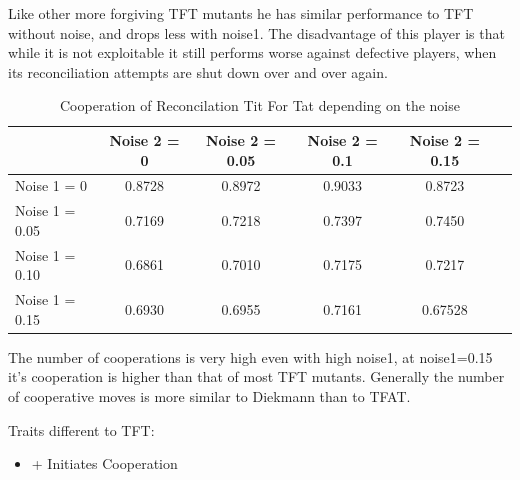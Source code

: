\documentclass[11pt,twoside]{article}
\begin{document}
Like other more forgiving TFT mutants he has similar performance to TFT without noise, and drops less with noise1. The disadvantage of this player is that while it is not exploitable it still performs worse against defective players, when its reconciliation attempts are shut down over and over again.

\begin{table}[h]
 \begin{center}
\caption{Cooperation of Reconcilation Tit For Tat depending on the noise} \vspace{3mm}
\begin{tabular}{|l|c|c|c|c|c|}
\hline
   	& Noise 2 = 0 & Noise 2 = 0.05& Noise 2 = 0.1& Noise 2 = 0.15 \\
  \hline
  Noise 1 = 0 	&  0.8728  &  0.8972  &  0.9033 &   0.8723 \\
 \hline
  Noise 1 = 0.05	 &       0.7169 &   0.7218  &  0.7397 &   0.7450 \\
 \hline
  Noise 1 = 0.10 	&       0.6861 &   0.7010 &   0.7175  &  0.7217 \\
 \hline
  Noise 1 = 0.15 	&      0.6930 &   0.6955  &  0.7161  &  0.67528 \\
 \hline
\end{tabular}
 \end{center}
\end{table}

The number of cooperations is very high even with high noise1, at noise1=0.15 it's cooperation is higher than that of most TFT mutants. Generally the number of cooperative moves is more similar to Diekmann than to TFAT.

Traits different to TFT:

\renewcommand{\labelitemi}{}
\begin{itemize}
	\item + Initiates Cooperation
\end{itemize}
\renewcommand{\labelitemi}{$\bullet$}

\newpage
\end{document}
